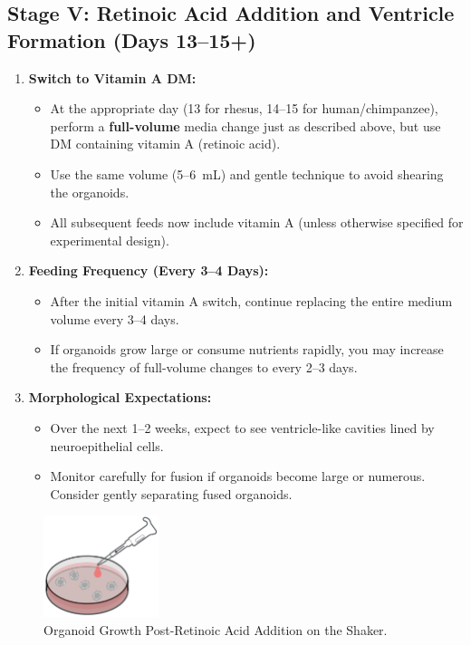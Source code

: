 \documentclass[11pt]{article}
\begin{document}
\subsection{Stage V: Retinoic Acid Addition and Ventricle Formation (Days 13--15+)}
\begin{enumerate}[leftmargin=*]

    \item \textbf{Switch to Vitamin A DM:}
    \begin{itemize}[leftmargin=*]
        \item At the appropriate day (13 for rhesus, 14--15 for human/chimpanzee), perform a \textbf{full-volume} media change just as described above, but use DM containing vitamin A (retinoic acid).
        \item Use the same volume (5--6~mL) and gentle technique to avoid shearing the organoids.
        \item All subsequent feeds now include vitamin A (unless otherwise specified for experimental design).
    \end{itemize}

    \item \textbf{Feeding Frequency (Every 3--4 Days):}
    \begin{itemize}[leftmargin=*]
        \item After the initial vitamin A switch, continue replacing the entire medium volume every 3--4 days.
        \item If organoids grow large or consume nutrients rapidly, you may increase the frequency of full-volume changes to every 2--3 days.
    \end{itemize}

    \item \textbf{Morphological Expectations:}
    \begin{itemize}[leftmargin=*]
        \item Over the next 1--2 weeks, expect to see ventricle-like cavities lined by neuroepithelial cells.
        \item Monitor carefully for fusion if organoids become large or numerous. Consider gently separating fused organoids.
    \end{itemize}

\end{enumerate}

\begin{figure}[H]
    \centering
    \includegraphics[width=0.3\textwidth]{5.png}
    \caption{Organoid Growth Post-Retinoic Acid Addition on the Shaker.}
    \label{fig:retinoic_acid}
\end{figure}
\end{document}
